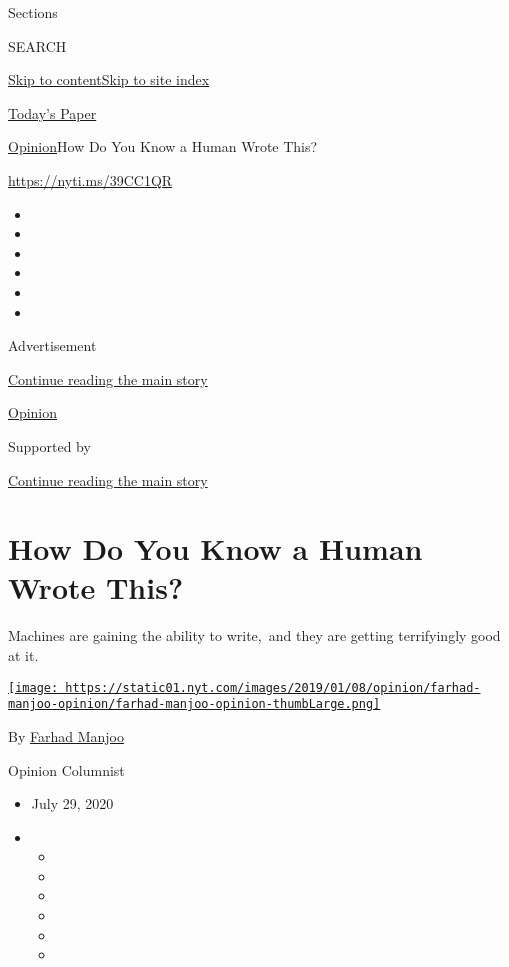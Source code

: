 Sections

SEARCH

\protect\hyperlink{site-content}{Skip to
content}\protect\hyperlink{site-index}{Skip to site index}

\href{https://myaccount.nytimes.com/auth/login?response_type=cookie\&client_id=vi}{}

\href{https://www.nytimes.com/section/todayspaper}{Today's Paper}

\href{/section/opinion}{Opinion}\textbar{}How Do You Know a Human Wrote
This?

\href{https://nyti.ms/39CC1QR}{https://nyti.ms/39CC1QR}

\begin{itemize}
\item
\item
\item
\item
\item
\item
\end{itemize}

Advertisement

\protect\hyperlink{after-top}{Continue reading the main story}

\href{/section/opinion}{Opinion}

Supported by

\protect\hyperlink{after-sponsor}{Continue reading the main story}

\hypertarget{how-do-you-know-a-human-wrote-this}{%
\section{How Do You Know a Human Wrote
This?}\label{how-do-you-know-a-human-wrote-this}}

Machines are gaining the ability to write,~and they are getting
terrifyingly good at it.

\href{https://www.nytimes.com/by/farhad-manjoo}{\texttt{[image: https://static01.nyt.com/images/2019/01/08/opinion/farhad-manjoo-opinion/farhad-manjoo-opinion-thumbLarge.png]}}

By \href{https://www.nytimes.com/by/farhad-manjoo}{Farhad Manjoo}

Opinion Columnist

\begin{itemize}
\item
  July 29, 2020
\item
  \begin{itemize}
  \item
  \item
  \item
  \item
  \item
  \item
  \end{itemize}
\end{itemize}

